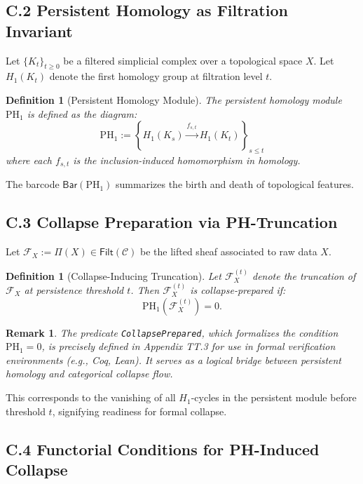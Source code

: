 \documentclass[11pt]{article}
\newtheorem{definition}[theorem]{Definition}
\newtheorem{remark}[theorem]{Remark}
\begin{document}
\subsection*{C.2 Persistent Homology as Filtration Invariant}

Let \( \{ K_t \}_{t \geq 0} \) be a filtered simplicial complex over a topological space \( X \).  
Let \( H_1(K_t) \) denote the first homology group at filtration level \( t \).

\begin{definition}[Persistent Homology Module]
The persistent homology module \( \mathrm{PH}_1 \) is defined as the diagram:
\[
\mathrm{PH}_1 := \left\{ H_1(K_s) \xrightarrow{f_{s,t}} H_1(K_t) \right\}_{s \leq t}
\]
where each \( f_{s,t} \) is the inclusion-induced homomorphism in homology.
\end{definition}

The barcode \( \mathsf{Bar}(\mathrm{PH}_1) \) summarizes the birth and death of topological features.

\subsection*{C.3 Collapse Preparation via PH-Truncation}

Let \( \mathcal{F}_X := \Pi(X) \in \mathsf{Filt}(\mathcal{C}) \) be the lifted sheaf associated to raw data \( X \).

\begin{definition}[Collapse-Inducing Truncation]
Let \( \mathcal{F}_X^{(t)} \) denote the truncation of \( \mathcal{F}_X \) at persistence threshold \( t \).  
Then \( \mathcal{F}_X^{(t)} \) is \emph{collapse-prepared} if:
\[
\mathrm{PH}_1(\mathcal{F}_X^{(t)}) = 0.
\]
\end{definition}

\begin{remark}
The predicate \texttt{CollapsePrepared}, which formalizes the condition \( \mathrm{PH}_1 = 0 \),  
is precisely defined in Appendix TT.3 for use in formal verification environments (e.g., Coq, Lean).  
It serves as a logical bridge between persistent homology and categorical collapse flow.
\end{remark}

This corresponds to the vanishing of all \( H_1 \)-cycles in the persistent module before threshold \( t \),  
signifying readiness for formal collapse.

\subsection*{C.4 Functorial Conditions for PH-Induced Collapse}
\end{document}
